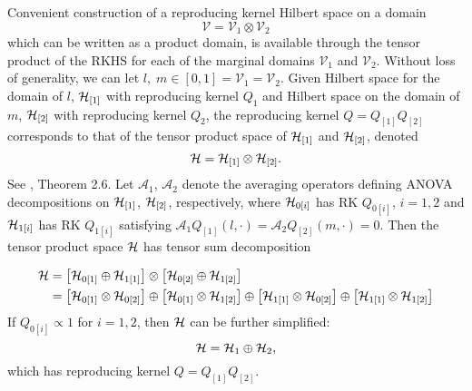 Convenient construction of a reproducing kernel Hilbert space on a domain
\[
\mathcal{V} = \mathcal{V}_1 \otimes \mathcal{V}_2
\]
\noindent
which can be written as a product domain, is available through the tensor product of the RKHS for each of the marginal domains $\mathcal{V}_1$ and $\mathcal{V}_2$. Without loss of generality, we can let $l,\;m \in \left[0,1\right] = \mathcal{V}_1 = \mathcal{V}_2$. Given Hilbert space for the domain of $l$, $\mathcal{H}_{\left[1\right]}$ with reproducing kernel $Q_1$ and Hilbert space on the domain of $m$, $\mathcal{H}_{\left[2\right]}$ with reproducing kernel $Q_2$, the reproducing kernel $Q = Q_{\left[1\right]}Q_{\left[2\right]}$ corresponds to that of the tensor product space of $\mathcal{H}_{\left[1\right]}$ and $\mathcal{H}_{\left[2\right]}$, denoted
\[
\mathcal{H} = \mathcal{H}_{\left[1\right]} \otimes \mathcal{H}_{\left[2\right]}.
\]
\noindent
See \citet{gu2002smoothing}, Theorem 2.6. Let $\mathcal{A}_1$, $\mathcal{A}_2$ denote the averaging operators defining ANOVA decompositions on $\mathcal{H}_{\left[1\right]}$, $\mathcal{H}_{\left[2\right]}$, respectively, where $\mathcal{H}_{0\left[i\right]}$ has RK $Q_{0\left[i\right]}$, $i = 1, 2$ and $\mathcal{H}_{1\left[i\right]}$ has RK $Q_{1\left[i\right]}$ satisfying $\mathcal{A}_1Q_{\left[1\right]}\left(l,\cdot\right) = \mathcal{A}_2Q_{\left[2\right]}\left(m,\cdot\right) = 0$. Then the tensor product space $\mathcal{H}$ has tensor sum decomposition

\begin{align} 
\begin{split} \label{eq:tensor-sum-decomposition}
\mathcal{H} &= \left[\mathcal{H}_{0\left[1\right]} \oplus \mathcal{H}_{1\left[1\right]} \right] \otimes \left[\mathcal{H}_{0\left[2\right]} \oplus \mathcal{H}_{1\left[2\right]} \right] \\
&= \left[\mathcal{H}_{0\left[1\right]} \otimes  \mathcal{H}_{0\left[2\right]}\right] \oplus \left[\mathcal{H}_{0\left[1\right]} \otimes \mathcal{H}_{1\left[2\right]}\right] \oplus \left[\mathcal{H}_{1\left[1\right]} \otimes  \mathcal{H}_{0\left[2\right]}\right] \oplus \left[\mathcal{H}_{1\left[1\right]} \otimes  \mathcal{H}_{1\left[2\right]}\right] 
\end{split}
\end{align}
\noindent
If $Q_{0\left[i\right]} \propto 1$ for $i = 1,2$, then $\mathcal{H}$ can be further simplified:
\begin{equation}
\mathcal{H} = \mathcal{H}_1 \oplus \mathcal{H}_2,
\end{equation}
\noindent
which has reproducing kernel $Q = Q_{\left[1\right]}Q_{\left[2\right]}$.

